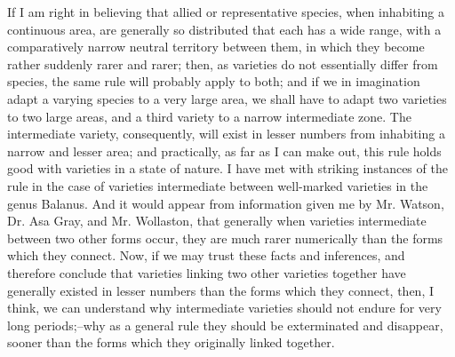 If I am right in believing that allied or representative species, when inhabiting a continuous area, are generally so distributed that each has a wide range, with a comparatively narrow neutral territory between them, in which they become rather suddenly rarer and rarer; then, as varieties do not essentially differ from species, the same rule will probably apply to both; and if we in imagination adapt a varying species to a very large area, we shall have to adapt two varieties to two large areas, and a third variety to a narrow intermediate zone. The intermediate variety, consequently, will exist in lesser numbers from inhabiting a narrow and lesser area; and practically, as far as I can make out, this rule holds good with varieties in a state of nature. I have met with striking instances of the rule in the case of varieties intermediate between well-marked varieties in the genus Balanus. And it would appear from information given me by Mr. Watson, Dr. Asa Gray, and Mr. Wollaston, that generally when varieties intermediate between two other forms occur, they are much rarer numerically than the forms which they connect. Now, if we may trust these facts and inferences, and therefore conclude that varieties linking two other varieties together have generally existed in lesser numbers than the forms which they connect, then, I think, we can understand why intermediate varieties should not endure for very long periods;--why as a general rule they should be exterminated and disappear, sooner than the forms which they originally linked together.
